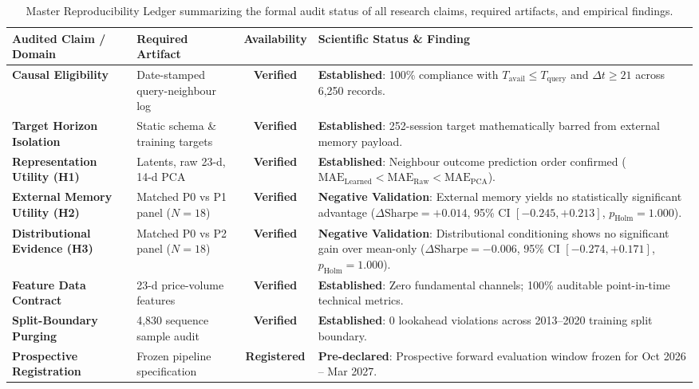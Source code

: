 \begin{table}[ht]
\centering
\small
\begin{tabular}{p{4.2cm}p{3.8cm}cp{4.8cm}}
\toprule
\textbf{Audited Claim / Domain} & \textbf{Required Artifact} & \textbf{Availability} & \textbf{Scientific Status \& Finding} \\
\midrule
\textbf{Causal Eligibility} & Date-stamped query-neighbour log & \textbf{Verified} & \textbf{Established}: 100\% compliance with $T_{\text{avail}} \le T_{\text{query}}$ and $\Delta t \ge 21$ across 6,250 records. \\
\addlinespace
\textbf{Target Horizon Isolation} & Static schema \& training targets & \textbf{Verified} & \textbf{Established}: 252-session target mathematically barred from external memory payload. \\
\addlinespace
\textbf{Representation Utility (H1)} & Latents, raw 23-d, 14-d PCA & \textbf{Verified} & \textbf{Established}: Neighbour outcome prediction order confirmed ($\text{MAE}_{\text{Learned}} < \text{MAE}_{\text{Raw}} < \text{MAE}_{\text{PCA}}$). \\
\addlinespace
\textbf{External Memory Utility (H2)} & Matched P0 vs P1 panel ($N=18$) & \textbf{Verified} & \textbf{Negative Validation}: External memory yields no statistically significant advantage ($\Delta\text{Sharpe} = +0.014$, 95\% CI $[-0.245, +0.213]$, $p_{\text{Holm}} = 1.000$). \\
\addlinespace
\textbf{Distributional Evidence (H3)} & Matched P0 vs P2 panel ($N=18$) & \textbf{Verified} & \textbf{Negative Validation}: Distributional conditioning shows no significant gain over mean-only ($\Delta\text{Sharpe} = -0.006$, 95\% CI $[-0.274, +0.171]$, $p_{\text{Holm}} = 1.000$). \\
\addlinespace
\textbf{Feature Data Contract} & 23-d price-volume features & \textbf{Verified} & \textbf{Established}: Zero fundamental channels; 100\% auditable point-in-time technical metrics. \\
\addlinespace
\textbf{Split-Boundary Purging} & 4,830 sequence sample audit & \textbf{Verified} & \textbf{Established}: 0 lookahead violations across 2013--2020 training split boundary. \\
\addlinespace
\textbf{Prospective Registration} & Frozen pipeline specification & \textbf{Registered} & \textbf{Pre-declared}: Prospective forward evaluation window frozen for Oct 2026 -- Mar 2027. \\
\bottomrule
\end{tabular}
\caption{Master Reproducibility Ledger summarizing the formal audit status of all research claims, required artifacts, and empirical findings.}
\label{tab:master_reproducibility_ledger}
\end{table}
